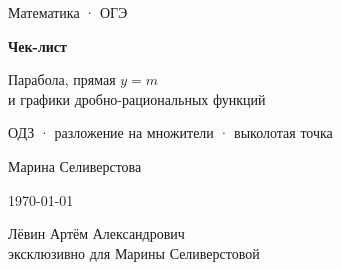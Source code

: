 \documentclass[a4paper,12pt]{article}
\begin{document}
\begin{titlepage}
\thispagestyle{empty}

\centering

\vspace*{24mm}

{\large\textcolor{softgray}{Математика · ОГЭ}\par}

\vspace{17mm}

{\fontsize{27}{32}\selectfont
\bfseries\color{darkaccent}
Чек-лист\par}

\vspace{7mm}

{\Large
Парабола, прямая \(y=m\)\\[2mm]
и графики дробно-рациональных функций\par}

\vspace{8mm}

{\large
ОДЗ · разложение на множители · выколотая точка\par}

\vspace{22mm}

{\large Марина Селиверстова\par}

\vspace{7mm}

{\normalsize \today\par}

\vfill

{\normalsize
Лёвин Артём Александрович\\
эксклюзивно для Марины Селиверстовой\par}

\vspace{17mm}


\vspace*{5mm}

\end{titlepage}

\end{document}
